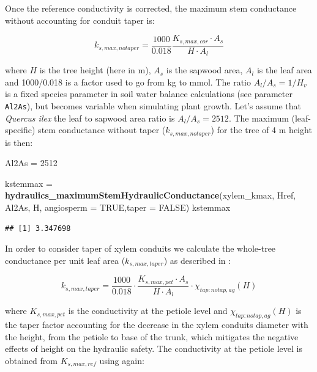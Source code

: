 \documentclass[]{book}
\newenvironment{Shaded}{\begin{snugshade}}{\end{snugshade}}
\newcommand{\KeywordTok}[1]{\textcolor[rgb]{0.13,0.29,0.53}{\textbf{#1}}}
\newcommand{\DataTypeTok}[1]{\textcolor[rgb]{0.13,0.29,0.53}{#1}}
\newcommand{\DecValTok}[1]{\textcolor[rgb]{0.00,0.00,0.81}{#1}}
\newcommand{\StringTok}[1]{\textcolor[rgb]{0.31,0.60,0.02}{#1}}
\newcommand{\OtherTok}[1]{\textcolor[rgb]{0.56,0.35,0.01}{#1}}
\newcommand{\NormalTok}[1]{#1}
\begin{document}
Once the reference conductivity is corrected, the maximum stem
conductance without accounting for conduit taper is:

\begin{equation}
k_{s,max, notaper}=\frac{1000}{0.018} \frac{K_{s,max,cor}\cdot A_{s}}{H\cdot A_{l}}
\end{equation}

where \(H\) is the tree height (here in m), \(A_{s}\) is the sapwood
area, \(A_{l}\) is the leaf area and 1000/0.018 is a factor used to go
from kg to mmol. The ratio \(A_{l}/A_{s} = 1/H_v\) is a fixed species
parameter in soil water balance calculations (see parameter
\texttt{Al2As}), but becomes variable when simulating plant growth.
Let's assume that \emph{Quercus ilex} the leaf to sapwood area ratio is
\(A_{l}/A_{s} = 2512\). The maximum (leaf-specific) stem conductance
without taper (\(k_{s, max, notaper}\)) for the tree of 4 m height is
then:

\begin{Shaded}
\begin{Highlighting}[]
\NormalTok{Al2As =}\StringTok{ }\DecValTok{2512} 

\NormalTok{kstemmax =}\StringTok{ }\KeywordTok{hydraulics_maximumStemHydraulicConductance}\NormalTok{(xylem_kmax, }
\NormalTok{                  Href, Al2As, H, }\DataTypeTok{angiosperm =} \OtherTok{TRUE}\NormalTok{,}\DataTypeTok{taper =} \OtherTok{FALSE}\NormalTok{)}
\NormalTok{kstemmax}
\end{Highlighting}
\end{Shaded}

\begin{verbatim}
## [1] 3.347698
\end{verbatim}

In order to consider taper of xylem conduits we calculate the whole-tree
conductance per unit leaf area (\(k_{s, max, taper}\)) as described in
\citet{Christoffersen2016}:

\begin{equation}
k_{s, max, taper}=\frac{1000}{0.018} \cdot \frac{K_{s,max,pet}\cdot A_{s}}{H\cdot A_{l}}\cdot \chi_{tap:notap,ag}(H)
\end{equation}

where \(K_{s,max,pet}\) is the conductivity at the petiole level and
\(\chi_{tap:notap,ag}(H)\) is the taper factor accounting for the
decrease in the xylem conduits diameter with the height, from the
petiole to base of the trunk, which mitigates the negative effects of
height on the hydraulic safety. The conductivity at the petiole level is
obtained from \(K_{s,max,ref}\) using again:
\end{document}
